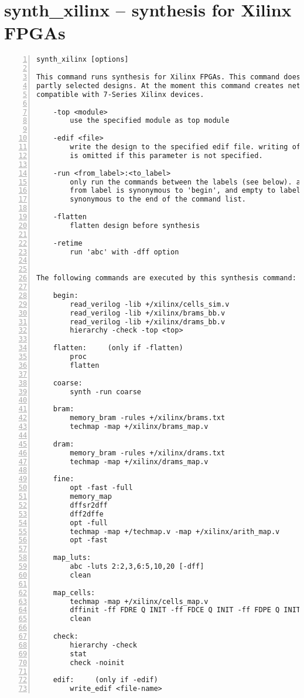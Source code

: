 \section{synth\_xilinx -- synthesis for Xilinx FPGAs}
\label{cmd:synth_xilinx}
\begin{lstlisting}[numbers=left,frame=single]
    synth_xilinx [options]

This command runs synthesis for Xilinx FPGAs. This command does not operate on
partly selected designs. At the moment this command creates netlists that are
compatible with 7-Series Xilinx devices.

    -top <module>
        use the specified module as top module

    -edif <file>
        write the design to the specified edif file. writing of an output file
        is omitted if this parameter is not specified.

    -run <from_label>:<to_label>
        only run the commands between the labels (see below). an empty
        from label is synonymous to 'begin', and empty to label is
        synonymous to the end of the command list.

    -flatten
        flatten design before synthesis

    -retime
        run 'abc' with -dff option


The following commands are executed by this synthesis command:

    begin:
        read_verilog -lib +/xilinx/cells_sim.v
        read_verilog -lib +/xilinx/brams_bb.v
        read_verilog -lib +/xilinx/drams_bb.v
        hierarchy -check -top <top>

    flatten:     (only if -flatten)
        proc
        flatten

    coarse:
        synth -run coarse

    bram:
        memory_bram -rules +/xilinx/brams.txt
        techmap -map +/xilinx/brams_map.v

    dram:
        memory_bram -rules +/xilinx/drams.txt
        techmap -map +/xilinx/drams_map.v

    fine:
        opt -fast -full
        memory_map
        dffsr2dff
        dff2dffe
        opt -full
        techmap -map +/techmap.v -map +/xilinx/arith_map.v
        opt -fast

    map_luts:
        abc -luts 2:2,3,6:5,10,20 [-dff]
        clean

    map_cells:
        techmap -map +/xilinx/cells_map.v
        dffinit -ff FDRE Q INIT -ff FDCE Q INIT -ff FDPE Q INIT
        clean

    check:
        hierarchy -check
        stat
        check -noinit

    edif:     (only if -edif)
        write_edif <file-name>
\end{lstlisting}

